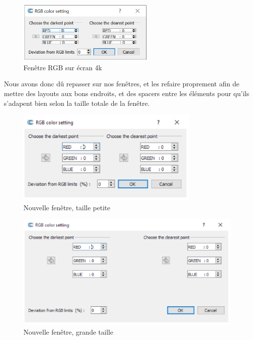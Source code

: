 \documentclass[12pt,titlepage,french]{article}
\begin{document}
\begin{figure}[H]
 \caption{\label{} Fenêtre RGB sur écran 4k}
 \begin{center}
 \includegraphics[width=0.6\textwidth]{./img/rgb_pb.PNG}
  \end{center}
\end{figure}

Nous avons donc dû repasser sur nos fenêtres, et les refaire proprement afin de mettre des layouts aux bons endroits, et des spacers entre les éléments pour qu'ils s'adapent bien selon la taille totale de la fenêtre.

\begin{figure}[H]
 \caption{\label{} Nouvelle fenêtre, taille petite}
 \begin{center}
 \includegraphics[width=0.8\textwidth]{./img/rgb_new1.PNG}
  \end{center}
\end{figure}

\begin{figure}[H]
 \caption{\label{} Nouvelle fenêtre, grande taille}
 \begin{center}
 \includegraphics[width=1\textwidth]{./img/rgb_new2.PNG}
  \end{center}
\end{figure}
\end{document}
